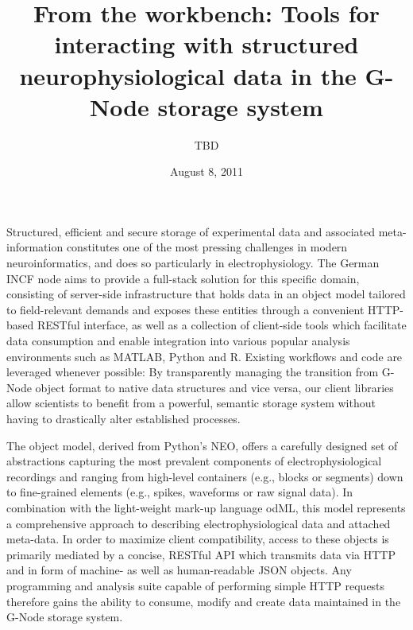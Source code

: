 \documentclass[a4paper]{article}
\begin{document}
\title{From the workbench: Tools for interacting with structured
  neurophysiological data in the G-Node storage system}

\author{TBD}
\date{August 8, 2011}

\maketitle


Structured, efficient and secure storage of experimental data and
associated meta-information constitutes one of the most pressing
challenges in modern neuroinformatics, and does so particularly in
electrophysiology. The German INCF node aims to provide a full-stack
solution for this specific domain, consisting of server-side
infrastructure that holds data in an object model tailored to
field-relevant demands and exposes these entities through a convenient
HTTP-based RESTful interface, as well as a collection of client-side
tools which facilitate data consumption and enable integration into
various popular analysis environments such as MATLAB, Python and
R. Existing workflows and code are leveraged whenever possible: By
transparently managing the transition from G-Node object format to
native data structures and vice versa, our client libraries allow
scientists to benefit from a powerful, semantic storage system without
having to drastically alter established processes.

The object model, derived from Python's NEO, offers a carefully
designed set of abstractions capturing the most prevalent components
of electrophysiological recordings and ranging from high-level
containers (e.g., blocks or segments) down to fine-grained elements
(e.g., spikes, waveforms or raw signal data). In combination with the
light-weight mark-up language odML, this model represents a
comprehensive approach to describing electrophysiological data and
attached meta-data. In order to maximize client compatibility, access
to these objects is primarily mediated by a concise, RESTful API which
transmits data via HTTP and in form of machine- as well as
human-readable JSON objects. Any programming and analysis suite
capable of performing simple HTTP requests therefore gains the ability
to consume, modify and create data maintained in the G-Node storage
system.
\end{document}
